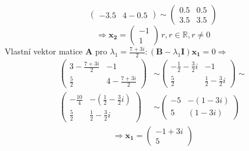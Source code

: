 \begin{mdframed}[style=mdexam]
\begin{example}
\begin{equation*}
\begin{pmatrix}
        -3.5      &  4-0.5
      \end{pmatrix}
      \sim
      \begin{pmatrix}
        0.5  &  0.5       \\
        3.5  &  3.5
      \end{pmatrix}
    \end{equation*}
    \begin{equation*}
      \Rightarrow\mathbf{x_2} =
      \begin{pmatrix}
        -1 \\ 1
      \end{pmatrix}
      \, r, r\in\mathbb{R}, r\neq0
    \end{equation*}
    Vlastní vektor matice \(\mathbf{A}\) pro \(\lambda_1=\frac{7+3i}{2}: (\mathbf{B} -
    \lambda_1\mathbf{I})\mathbf{x_1}=0 \Rightarrow\)
    \begin{align*}
      \begin{pmatrix}
        3 - \frac{7+3i}{2}            & -1                                       \\
        \frac{5}{2}                   &  4 - \frac{7+3i}{2}
      \end{pmatrix}
      &\sim
      \begin{pmatrix}
        -\frac{1}{2}-\frac{3}{2}i      &  -1                                     \\
        \frac{5}{2}                    & \frac{1}{2}-\frac{3}{2}i
      \end{pmatrix}
      \sim                                                                            \\
      \begin{pmatrix}
        -\frac{10}{4}                  &-\left(\frac{1}{2} -\frac{3}{2}i\right)  \\
        \frac{5}{2}                    & \frac{1}{2}-\frac{3}{2}i
      \end{pmatrix}
      &\sim
      \begin{pmatrix}
        -5                           &-\left(1-3i\right)                         \\
         5                           & \left(1-3i\right)
      \end{pmatrix}
    \end{align*} 
    \begin{align*} 
      \Rightarrow \mathbf{x_1}=
      \begin{pmatrix}
        -1+3i \\ 5

\end{pmatrix}
\end{align*}
\end{example}
\end{mdframed}
